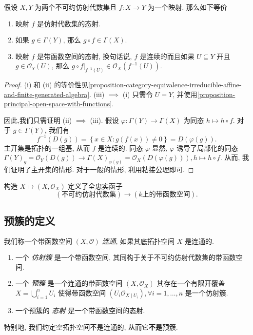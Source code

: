 \begin{proposition}
  假设 \( X, Y \) 为两个不可约仿射代数集且 \( f: X \to Y \) 为一个映射.
  那么如下等价
  \begin{enumerate}
    \item 映射 \( f \) 是仿射代数集的态射.
    \item 如果 \( g \in \Gamma(Y) \), 那么 \( g \circ f \in \Gamma(X) \).
    \item 映射 \( f \) 是带函数空间的态射, 换句话说, \( f \) 是连续的而且如果 \(
      U \subseteq Y \) 开且 \( g \in \mathscr{O}_Y(U) \), 那么 \(
      \left. g \circ f \right\vert_{f^{-1}(U)} \in \mathscr{O}_X(f^{-1}(U)) \).
  \end{enumerate}
\end{proposition}
\begin{proof}
  (i) 和 (ii)
  的等价性见\cref{proposition-category-equivalence-irreducible-affine-and-finite-generated-algebra}.
  (iii) \( \implies \) (i) 只需令 \( U = Y \),
  并使用\cref{proposition-principal-open-space-with-functions}. 

  因此,我们只需证明 (ii) \( \implies \) (iii). 假设 \( \varphi: \Gamma(Y) \to
  \Gamma(X) \) 为同态 \( h \mapsto h \circ f \). 对于 \( g \in \Gamma(Y) \),
  我们有
  \[
    f^{-1}(D(g)) = \left\lbrace x \in X: g(f(x)) \neq 0 \right\rbrace =
    D(\varphi(g)).
  \]
  主开集是拓扑的一组基, 从而 \( f \) 是连续的. 同态 \( \varphi \)
  显然, \( \varphi \) 诱导了局部化的同态 \( \Gamma(Y)_g = \mathscr{O}_Y(D(g)) \to
  \Gamma(X)_{\varphi(g)} = \mathscr{O}_X(D(\varphi(g))), h \mapsto h \circ f \).
  从而, 我们证明了主开集的情形. 对于一般的情形, 利用粘接公理即可.
\end{proof}

\begin{theorem}
  构造 \( X \mapsto (X, \mathscr{O}_X) \) 定义了全忠实函子
  \[
    \left( \text{不可约仿射代数集} \right)  \to  \left( k \text{上的带函数空间}
    \right).
  \]
\end{theorem}

\subsection{预簇的定义}

我们称一个带函数空间 \( (X, \mathscr{O}) \) \emph{连通}, 如果其底拓扑空间 \( X
\) 是连通的.

\begin{enumerate}
  \item 一个 \emph{仿射簇} 是一个带函数空间,
    其同构于关于不可约仿射代数集的带函数空间.
  \item 一个 \emph{预簇} 是一个连通的带函数空间 \( (X, \mathscr{O}_X) \)
    其存在一个有限开覆盖 \( X = \bigcup_{i = 1}^n U_i \) 使得带函数空间 \( (U_i
    \mathscr{O}_{X \mid U_i}), \forall i = 1, \ldots, n \) 是一个仿射簇.
  \item 一个预簇的 \emph{态射} 是一个带函数空间的态射.
\end{enumerate}
特别地, 我们约定空拓扑空间不是连通的, 从而它\textbf{不是}预簇.


